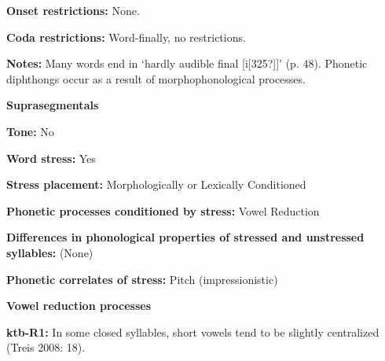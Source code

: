 \begin{styleBody}
\textbf{Onset restrictions:} None.
\end{styleBody}

\begin{styleBody}
\textbf{Coda restrictions:} Word-finally, no restrictions.
\end{styleBody}

\begin{styleBody}
\textbf{Notes: }Many words end in ‘hardly audible final [i[325?]]’ (p. 48). Phonetic diphthongs occur as a result of morphophonological processes.
\end{styleBody}

\begin{styleBody}
\textbf{Suprasegmentals}
\end{styleBody}

\begin{styleBody}
\textbf{Tone:} No
\end{styleBody}

\begin{styleBody}
\textbf{Word stress: }Yes
\end{styleBody}

\begin{styleBody}
\textbf{Stress placement:} Morphologically or Lexically Conditioned
\end{styleBody}

\begin{styleBody}
\textbf{Phonetic processes conditioned by stress:} Vowel Reduction
\end{styleBody}

\begin{styleBody}
\textbf{Differences in phonological properties of stressed and unstressed syllables:} (None)
\end{styleBody}

\begin{styleBody}
\textbf{Phonetic correlates of stress: }Pitch (impressionistic)
\end{styleBody}

\begin{styleBody}
\textbf{Vowel reduction processes}
\end{styleBody}

\begin{styleBody}
\textbf{ktb-R1: }In some closed syllables, short vowels tend to be slightly centralized (Treis 2008: 18).
\end{styleBody}

